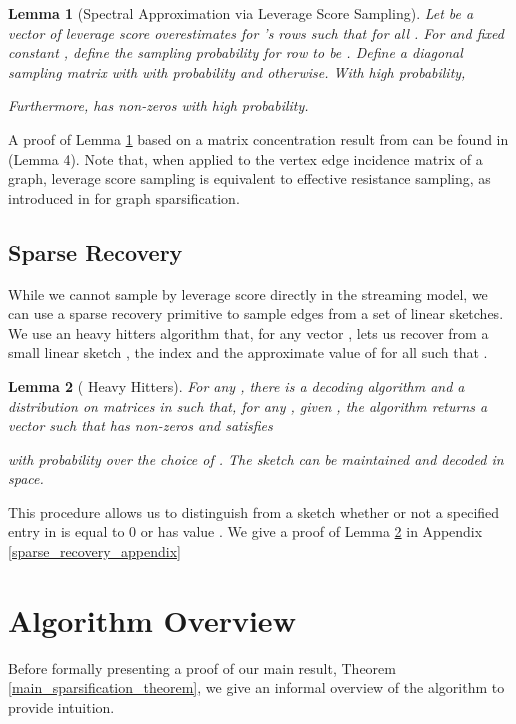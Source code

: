 \documentclass[11pt]{article}
\newtheorem{lemma}{Lemma}
\begin{document}
\begin{lemma}[Spectral Approximation via Leverage Score Sampling]\label{sparsifier_sampling}
Let  be a vector of leverage score overestimates for 's rows such that  for all . For  and fixed constant , define the sampling probability for row  to be . Define a diagonal sampling matrix  with  with probability  and  otherwise. With high probability,

Furthermore,  has  non-zeros with high probability. \end{lemma}
A proof of Lemma \ref{sparsifier_sampling} based on a matrix concentration result from \cite{tropp2012user} can be found in \cite{uniformSampling} (Lemma 4). Note that, when applied to the vertex edge incidence matrix of a graph, leverage score sampling is equivalent to effective resistance sampling, as introduced in \cite{graphSparsificationEffectiveResistance} for graph sparsification.

\subsection{Sparse Recovery}
\label{sparse recovery}
While we cannot sample by leverage score directly in the streaming model, we can use a sparse recovery primitive to sample edges from a set of linear sketches. We use an  heavy hitters algorithm that, for any vector , lets us recover from a small linear sketch , the index  and the approximate value of  for all  such that .

\begin{lemma}[ Heavy Hitters]
\label{sparse_recovery_primitive}
For any , there is a decoding algorithm  and a distribution on matrices  in  such that, for any , given , the algorithm  returns a vector  such that
 has  non-zeros and satisfies

with probability  over the choice of .
The sketch  can be maintained and decoded in  space. 
\end{lemma}
This procedure allows us to distinguish from a sketch whether or not a specified entry in  is equal to 0 or has value . 
We give a proof of Lemma \ref{sparse_recovery_primitive} in Appendix \ref{sparse_recovery_appendix}
 
\section{Algorithm Overview}\label{algorithm_overview}
Before formally presenting a proof of our main result, Theorem \ref{main_sparsification_theorem}, we give an informal overview of the algorithm to provide intuition. 
\end{document}
